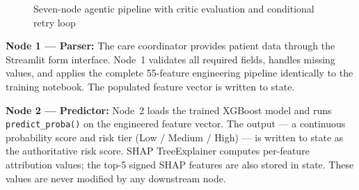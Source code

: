 \documentclass[12pt, a4paper]{report}
\begin{document}
\begin{figure}[ht]
\caption{Seven-node agentic pipeline with critic evaluation and conditional retry loop}
\label{fig:pipeline}
\end{figure}

\vspace{0.5cm}

\textbf{Node 1 --- Parser:}
The care coordinator provides patient data through the Streamlit form interface. Node~1 validates all required fields, handles missing values, and applies the complete 55-feature engineering pipeline identically to the training notebook. The populated feature vector is written to state.

\textbf{Node 2 --- Predictor:}
Node~2 loads the trained XGBoost model and runs \texttt{predict\_proba()} on the engineered feature vector. The output --- a continuous probability score and risk tier (Low / Medium / High) --- is written to state as the authoritative risk score. SHAP TreeExplainer computes per-feature attribution values; the top-5 signed SHAP features are also stored in state. These values are never modified by any downstream node.
\end{document}
